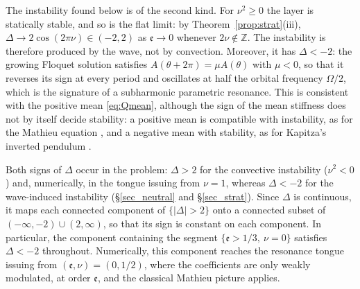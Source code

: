 \documentclass[reqno]{amsart}
\newcommand{\D}{\mathcal{D}}
\newcommand{\ee}{\mathfrak{e}}
\begin{document}
The instability found below is of the second kind. For $\nu^{2}\ge0$ the layer is statically stable, and so is the flat limit: by Theorem~\ref{prop:strat}(iii), $\Delta\to2\cos(2\pi\nu)\in(-2,2)$ as $\ee\to0$ whenever $2\nu\notin\mathbb Z$. The instability is therefore produced by the wave, not by convection. Moreover, it has $\Delta<-2$: the growing Floquet solution satisfies $A(\theta+2\pi)=\mu A(\theta)$ with $\mu<0$, so that it reverses its sign at every period and oscillates at half the orbital frequency $\Omega/2$, which is the signature of a subharmonic parametric resonance. This is consistent with the positive mean \eqref{eq:Qmean}, although the sign of the mean stiffness does not by itself decide stability: a positive mean is compatible with instability, as for the Mathieu equation \cite{MagnusWinkler,McLachlan}, and a negative mean with stability, as for Kapitza's inverted pendulum \cite{Kapitza1951,LeviWeckesser1995}.

Both signs of $\Delta$ occur in the problem: $\Delta>2$ for the convective instability ($\nu^2<0$) and, numerically, in the tongue issuing from $\nu=1$, whereas $\Delta<-2$ for the wave-induced instability (\S\ref{sec_neutral} and \S\ref{sec_strat}). Since $\Delta$ is continuous, it maps each connected component of $\{|\Delta|>2\}$ onto a connected subset of $(-\infty,-2)\cup(2,\infty)$, so that its sign is constant on each component. In particular, the component containing the segment $\{\ee>1/3,\ \nu=0\}$ satisfies $\Delta<-2$ throughout. Numerically, this component reaches the resonance tongue issuing from $(\ee,\nu)=(0,1/2)$, where the coefficients are only weakly modulated, at order $\ee$, and the classical Mathieu picture applies.


\end{document}
